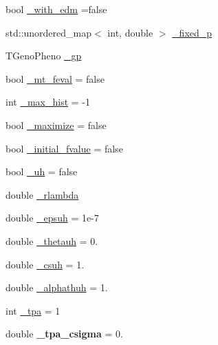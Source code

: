 \begin{DoxyCompactItemize}
bool \hyperlink{classlibcmaes_1_1Parameters_adbaa11317ae66061e097c372522b8758}{\+\_\+with\+\_\+edm} =false
\item 
std\+::unordered\+\_\+map$<$ int, double $>$ \hyperlink{classlibcmaes_1_1Parameters_a83fdae9d4bb9b77c8ad955c6aac75086}{\+\_\+fixed\+\_\+p}
\item 
T\+Geno\+Pheno \hyperlink{classlibcmaes_1_1Parameters_ab8e153b4785de9358599caa840b94ef2}{\+\_\+gp}
\item 
bool \hyperlink{classlibcmaes_1_1Parameters_a78a3b97b4119776b661c1be4fc283069}{\+\_\+mt\+\_\+feval} = false
\item 
int \hyperlink{classlibcmaes_1_1Parameters_a6ecc091e7e10b30c067f28e5be05faff}{\+\_\+max\+\_\+hist} = -\/1
\item 
bool \hyperlink{classlibcmaes_1_1Parameters_a8c65760fc2d97303d9881c2a945d1d7b}{\+\_\+maximize} = false
\item 
bool \hyperlink{classlibcmaes_1_1Parameters_a421b56efbe82da078cbe32a6c59ea80f}{\+\_\+initial\+\_\+fvalue} = false
\item 
bool \hyperlink{classlibcmaes_1_1Parameters_a4dc4905889ab02a2a74386875dc4f834}{\+\_\+uh} = false
\item 
double \hyperlink{classlibcmaes_1_1Parameters_a35486ec0b31b3450a0cb10e54f16b7fd}{\+\_\+rlambda}
\item 
double \hyperlink{classlibcmaes_1_1Parameters_ab79e42306610b24fafe017a011373bd8}{\+\_\+epsuh} = 1e-\/7
\item 
double \hyperlink{classlibcmaes_1_1Parameters_af125dad682b5a40f05ac42351f548ff9}{\+\_\+thetauh} = 0.
\item 
double \hyperlink{classlibcmaes_1_1Parameters_acedc12aaa2bcb0923279a15fc2fd4295}{\+\_\+csuh} = 1.
\item 
double \hyperlink{classlibcmaes_1_1Parameters_afe9928f77d0413fb75a24fe0cb0f947b}{\+\_\+alphathuh} = 1.
\item 
int \hyperlink{classlibcmaes_1_1Parameters_a9f38bf1e37112abf71045225817cd30b}{\+\_\+tpa} = 1
\item 
\hypertarget{classlibcmaes_1_1Parameters_ae1175ebd72ba7af46a3b7d8081e4a205}{double {\bfseries \+\_\+tpa\+\_\+csigma} = 0.}\label{classlibcmaes_1_1Parameters_ae1175ebd72ba7af46a3b7d8081e4a205}

\end{DoxyCompactItemize}
